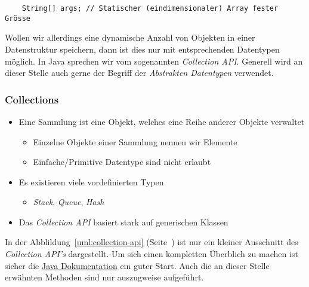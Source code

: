 \begin{Exercise}[%
title={Verwalten von Studenten und Kursbelegungen},
label={ex:course}]
\begin{verbatim}
    String[] args; // Statischer (eindimensionaler) Array fester Grösse
\end{verbatim}

Wollen wir allerdings eine dynamische Anzahl von Objekten in einer Datenstruktur
speichern, dann ist dies nur mit entsprechenden Datentypen möglich. In Java
sprechen wir vom sogenannten \emph{Collection API}. Generell wird an dieser
Stelle auch gerne der Begriff der \emph{Abstrakten Datentypen} verwendet.

\begin{frame}[fragile]
    \frametitle<presentation>{Collections}
    \begin{itemize}
        \item Eine Sammlung ist eine Objekt, welches eine Reihe anderer
        Objekte verwaltet
        \begin{itemize}
            \item Einzelne Objekte einer Sammlung nennen wir Elemente
            \item Einfache/Primitive Datentype sind nicht erlaubt
        \end{itemize}
        \item Es existieren viele vordefinierten Typen
        \begin{itemize}
            \item \emph{Stack}, \emph{Queue}, \emph{Hash}
        \end{itemize}
        \item Das \emph{Collection API} basiert stark auf generischen Klassen
    \end{itemize}
\end{frame}

In der Abblildung~\ref{uml:collection-api} (Seite~\pageref{uml:collection-api}) ist
nur ein kleiner Ausschnitt des \emph{Collection API's} dargestellt. Um sich einen
kompletten Überblich zu machen ist sicher die
\href{https://docs.oracle.com/en/java/javase/11/docs/api/java.base/java/util/Collection.html}
{Java Dokumentation} ein guter Start. Auch die an dieser Stelle erwähnten Methoden sind
nur auszugweise aufgeführt.

\begin{figure}[ht]
    \centering
\end{figure}
\end{Exercise}
